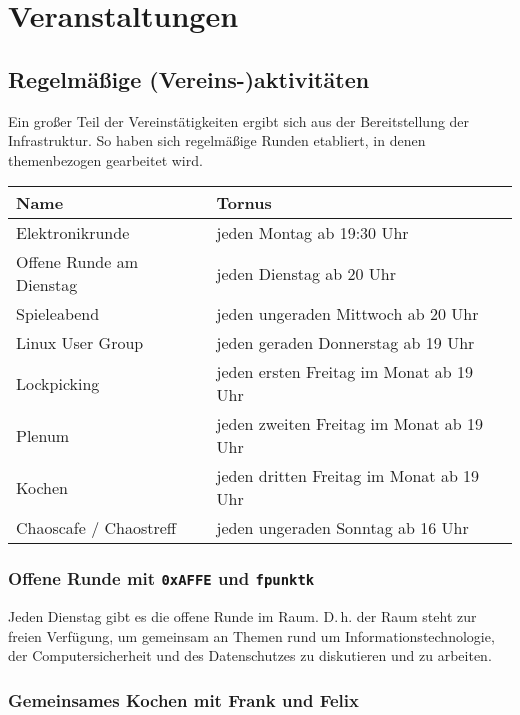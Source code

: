 \documentclass[10pt,DIV16]{scrartcl}
\begin{document}
\section{Veranstaltungen}

\subsection{Regelmäßige (Vereins-)aktivitäten}

Ein großer Teil der Vereinstätigkeiten ergibt sich aus der
Bereitstellung der Infrastruktur. So haben sich regelmäßige Runden
etabliert, in denen themenbezogen gearbeitet wird.

\begin{table}[h]
	\begin{tabular}{l|l}
		Name   &  Tornus \\ \hline
		Elektronikrunde   &  jeden Montag ab 19:30 Uhr\\
		Offene Runde am Dienstag   &  jeden Dienstag ab 20 Uhr\\
		Spieleabend   &  jeden ungeraden Mittwoch ab 20 Uhr\\
		Linux User Group   &  jeden geraden Donnerstag ab 19 Uhr\\
		Lockpicking   &  jeden ersten Freitag im Monat ab 19 Uhr\\
		Plenum   &  jeden zweiten Freitag im Monat ab 19 Uhr\\
		Kochen   &  jeden dritten Freitag im Monat ab 19 Uhr\\
		Chaoscafe / Chaostreff   &  jeden ungeraden Sonntag ab 16 Uhr\\
\end{tabular}
\end{table}

\subsubsection{Offene Runde mit \texttt{0xAFFE} und \texttt{fpunktk}}

Jeden Dienstag gibt es die offene Runde im Raum. D.\,h. der Raum
steht zur freien Verfügung, um gemeinsam an Themen rund um
Informationstechnologie, der Computersicherheit und des
Datenschutzes zu diskutieren und zu arbeiten.

\subsubsection{Gemeinsames Kochen mit Frank und Felix}
\end{document}
